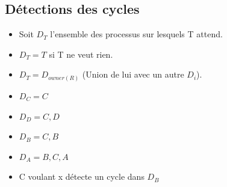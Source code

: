 \begin{frame}{\sectitle}
\begin{block}{\subsectitle}
\def\subsectitle{Détections des cycles}
\subsection{\subsectitle}
\begin{itemize}
    \item Soit $D_{T}$ l'ensemble des processus sur lesquels T attend.
    \item $D_{T} = T$ si T ne veut rien.
    \item $D_{T} = D_{owner(R)}$ (Union de lui avec un autre $D_{i}$).
\end{itemize}
\end{block}

\begin{exampleblock}{\subsectitle}
\begin{itemize}
    \item $D_{C} = {C}$
    \item $D_{D} = {C,D}$
    \item $D_{B} = {C,B}$
    \item $D_{A} = {B,C,A}$
    \item C voulant x détecte un cycle dans $D_{B}$
\end{itemize}
\end{exampleblock}

\end{frame}


\def\sectitle{Sémaphores}
